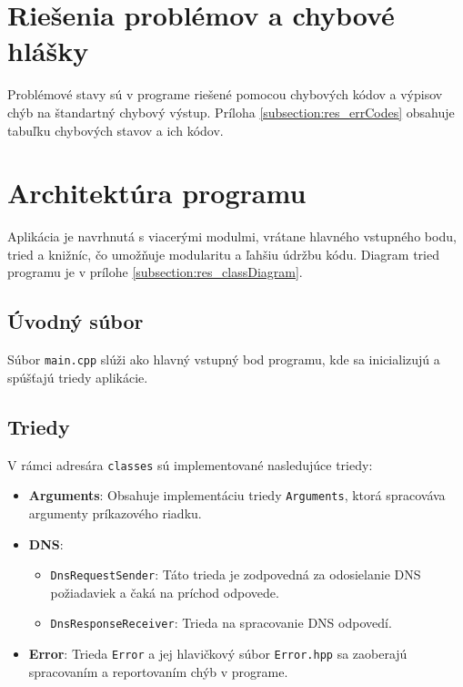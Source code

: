 \documentclass[a4paper, 11pt]{article}
\begin{document}
	\section{Riešenia problémov a chybové hlášky}
	Problémové stavy sú v programe riešené pomocou chybových kódov a výpisov chýb na štandartný chybový výstup.
	Príloha \ref{subsection:res_errCodes} obsahuje tabuľku chybových stavov a ich kódov.
	
	
	\section{Architektúra programu}
	Aplikácia je navrhnutá s viacerými modulmi, vrátane hlavného vstupného bodu, tried a knižníc, čo umožňuje modularitu a ľahšiu údržbu kódu. Diagram tried programu je v prílohe \ref{subsection:res_classDiagram}.

	\subsection{Úvodný súbor}
	Súbor \texttt{main.cpp} slúži ako hlavný vstupný bod programu, kde sa inicializujú a spúšťajú triedy aplikácie.
	
	\subsection{Triedy}
	V rámci adresára \texttt{classes} sú implementované nasledujúce triedy:
	
	\begin{itemize}
		\item \textbf{Arguments}: Obsahuje implementáciu triedy \texttt{Arguments}, ktorá spracováva argumenty príkazového riadku.
		\item \textbf{DNS}:
		\begin{itemize}
			\item \texttt{DnsRequestSender}: Táto trieda je zodpovedná za odosielanie DNS požiadaviek a čaká na príchod odpovede.
			\item \texttt{DnsResponseReceiver}: Trieda na spracovanie DNS odpovedí.
		\end{itemize}
		\item \textbf{Error}: Trieda \texttt{Error} a jej hlavičkový súbor \texttt{Error.hpp} sa zaoberajú spracovaním a reportovaním chýb v programe.
	\end{itemize}
	
\end{document}
